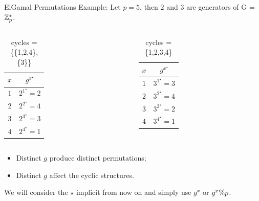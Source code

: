 \begin{frame}{ElGamal Permutations}
Example: Let $p =5$, then $2$ and $3$ are generators of G = $\mathbb{Z}_p^*$.

    \begin{columns}
        \begin{column}{0.45\textwidth}
        \centering
            \begin{table}[]
    	    \begin{tabular}{c|c}
    	        $x$ & $g^{x^\star} $ \\ \hline \hline
    	        $1$ & $2^{1^\star} = 2$ \\
    	        $2$ & $2^{2^\star} = 4$ \\
    	        $3$ & $2^{3^\star} = 3$ \\
    	        $4$ & $2^{4^\star} = 1$  
    	    \end{tabular}
    	    \caption{cycles = \{\{1,2,4\},\{3\}\}}
    	    \label{tab:xmap1}
    	    \end{table}
        \end{column}
        \begin{column}{0.45\textwidth}
    	    \centering
            \begin{table}[]
    	    \begin{tabular}{c|c}
    	        $x$ & $g^{x^\star} $ \\ \hline \hline
    	        $1$ & $3^{1^\star} = 3$ \\
    	        $2$ & $3^{2^\star} = 4$ \\
    	        $3$ & $3^{3^\star} = 2$ \\
    	        $4$ & $3^{4^\star} = 1$
    	    \end{tabular}
    	    \caption{cycles = \{1,2,3,4\}}
    	    \label{tab:xmap2}
    	    \end{table}
        \end{column}
  \end{columns}
  
  \pause
  \begin{itemize}
      \item Distinct $g$ produce distinct permutations;
      \item Distinct $g$ affect the cyclic structures.
  \end{itemize}
  
  We will consider the $\star$ implicit from now on and simply use $g^x$ or $g^x \% p$.
  
\end{frame}


